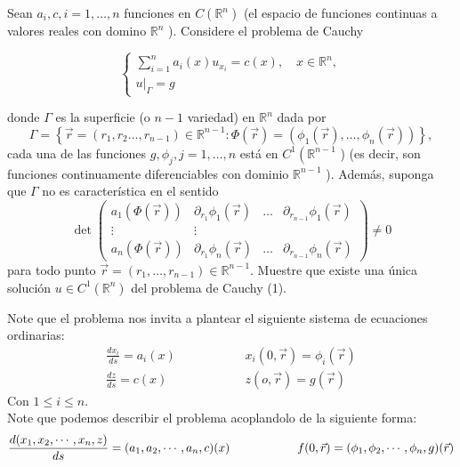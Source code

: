 \begin{homeworkProblem}
    Sean $a_i, c, i=1, \ldots, n$ funciones en $C\left(\mathbb{R}^n\right)$ (el espacio de funciones continuas a valores reales con domino $\mathbb{R}^n$ ). Considere el problema de Cauchy

\begin{equation}
    \left\{\begin{array}{l}
\displaystyle\sum_{i=1}^n a_i(x) u_{x_i}=c(x), \quad x \in \mathbb{R}^n, \\
\left.u\right|_{\Gamma}=g
\end{array}\right.
\end{equation}

donde $\Gamma$ es la superficie (o $n-1$ variedad) en $\mathbb{R}^n$ dada por
$$
\Gamma=\left\{\vec{r}=\left(r_1, r_2 \ldots, r_{n-1}\right) \in \mathbb{R}^{n-1}: \Phi(\vec{r})=\left(\phi_1(\vec{r}), \ldots, \phi_n(\vec{r})\right)\right\},
$$
cada una de las funciones $g, \phi_j, j=1, \ldots, n$ está en $C^1\left(\mathbb{R}^{n-1}\right.$ ) (es decir, son funciones continuamente diferenciables con dominio $\mathbb{R}^{n-1}$ ). Además, suponga que $\Gamma$ no es característica en el sentido
$$
\operatorname{det}\left(\begin{array}{cccc}
a_1(\Phi(\vec{r})) & \partial_{r_1} \phi_1(\vec{r}) & \ldots & \partial_{r_{n-1}} \phi_1(\vec{r}) \\
\vdots & \vdots & & \\
a_n(\Phi(\vec{r})) & \partial_{r_1} \phi_n(\vec{r}) & \ldots & \partial_{r_{n-1}} \phi_n(\vec{r})
\end{array}\right) \neq 0
$$
para todo punto $\vec{r}=\left(r_1, \ldots, r_{n-1}\right) \in \mathbb{R}^{n-1}$.
Muestre que existe una única solución $u \in C^1\left(\mathbb{R}^n\right)$ del problema de Cauchy (1).
\begin{solucion}
    Note que el problema nos invita a plantear el siguiente sistema de ecuaciones ordinarias:
    \begin{align*}
        \frac{dx_i}{ds}=a_i(x) &\hspace{2cm} x_i(0,\vec{r})=\phi_i(\vec{r})\\
        \frac{dz}{ds}=c(x) &\hspace{2cm} z(o,\vec{r})=g(\vec{r})
    \end{align*}
    Con $1\leq i\leq n$.\\
    Note que podemos describir el problema acoplandolo de la siguiente forma:
    \begin{align*}
        \frac{d(x_1,x_2,\cdots,x_n,z)}{ds}=(a_1,a_2,\cdots,a_n,c)(x) \hspace{2 cm} f(0,\vec{r})=(\phi_1,\phi_2,\cdots,\phi_n,g)(\vec{r})

\end{align*}
\end{solucion}
\end{homeworkProblem}
